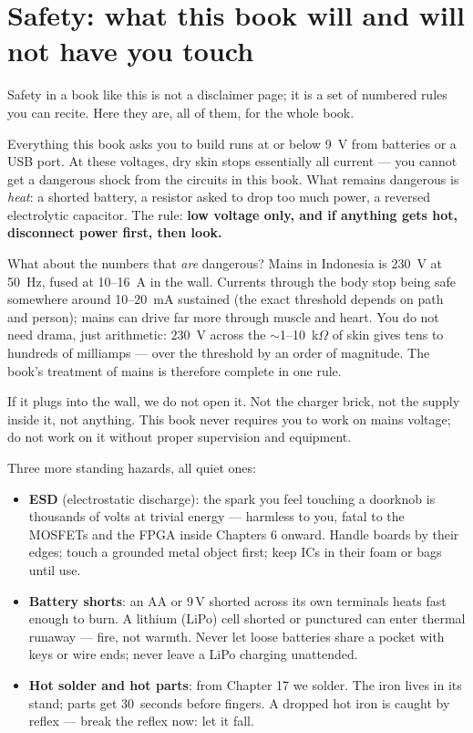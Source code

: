 \section{Safety: what this book will and will not have you touch}
\label{sec:safety}

Safety in a book like this is not a disclaimer page; it is a set of numbered
rules you can recite. Here they are, all of them, for the whole book.

\begin{rulebox}
Everything this book asks you to build runs at or below
\qty{9}{\volt} from batteries or a USB port. At these voltages, dry skin stops
essentially all current — you cannot get a dangerous shock from the circuits
in this book. What remains dangerous is \emph{heat}: a shorted battery, a
resistor asked to drop too much power, a reversed electrolytic capacitor. The
rule: \textbf{low voltage only, and if anything gets hot, disconnect power
first, then look.}
\end{rulebox}

What about the numbers that \emph{are} dangerous? Mains in Indonesia is
\qty{230}{\volt} at \qty{50}{\hertz}, fused at 10--16~A in the wall. Currents
through the body stop being safe somewhere around 10--20~mA sustained (the
exact threshold depends on path and person); mains can drive far more through
muscle and heart. You do not need drama, just arithmetic: $230$~V across the
$\sim$1--10~k$\Omega$ of skin gives tens to hundreds of milliamps — over the
threshold by an order of magnitude. The book's treatment of mains is therefore
complete in one rule.

\begin{rulebox}
If it plugs into the wall, we do not open it. Not the charger brick, not the
supply inside it, not anything. This book never requires you to work on
mains voltage; do not work on it without proper supervision and equipment.
\end{rulebox}

Three more standing hazards, all quiet ones:

\begin{itemize}
\item \textbf{ESD} (electrostatic discharge): the spark you feel
touching a doorknob is thousands of volts at trivial energy — harmless to you,
fatal to the MOSFETs and the FPGA inside Chapters 6 onward. Handle boards by
their edges; touch a grounded metal object first; keep ICs in their foam or
bags until use.
\item \textbf{Battery shorts}: an AA or 9\,V shorted
across its own terminals heats fast enough to burn. A lithium (LiPo) cell
shorted or punctured can enter thermal runaway — fire, not warmth. Never let
loose batteries share a pocket with keys or wire ends; never leave a LiPo
charging unattended.
\item \textbf{Hot solder and hot parts}: from Chapter 17 we solder. The iron
lives in its stand; parts get 30~seconds before fingers. A dropped hot iron is
caught by reflex — break the reflex now: let it fall.
\end{itemize}

